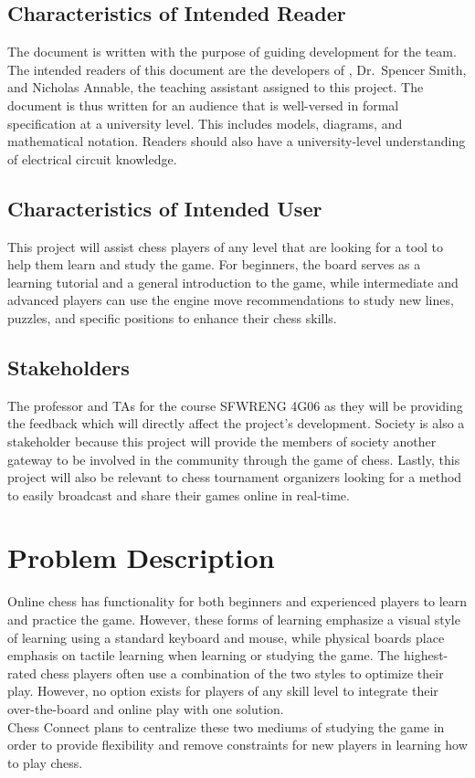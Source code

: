 \documentclass[12pt]{article}
\begin{document}
\subsection{Characteristics of Intended Reader}
{The document is written with the purpose of guiding development for the \progname{} team. The intended readers of this document 
are the developers of \progname{}, Dr.~Spencer Smith, and Nicholas Annable, the teaching assistant assigned to this project. The 
document is thus written for an audience that is well-versed in formal specification at a university level. This includes models, 
diagrams, and mathematical notation. Readers should also have a university-level understanding of electrical circuit knowledge.}

\subsection{Characteristics of Intended User}
{This project will assist chess players of any level that are looking for a tool to help them learn and study the game. For beginners, 
the board serves as a learning tutorial and a general introduction to the game, while intermediate and advanced players can use the 
engine move recommendations to study new lines, puzzles, and specific positions to enhance their chess skills.}

\subsection{Stakeholders}
{The professor and TAs for the course SFWRENG 4G06 as they will be providing the feedback which will directly affect the project’s development. 
Society is also a stakeholder because this project will provide the members of society another gateway to be involved in the community through the game of chess. Lastly, this project will 
also be relevant to chess tournament organizers looking for a method to easily broadcast and share their games online in real-time.}

\section{Problem Description}

{Online chess has functionality for both beginners and experienced players to
learn and practice the game. However, these forms of learning emphasize a
visual style of learning using a standard keyboard and mouse, while physical
boards place emphasis on tactile learning when learning or studying the game.
The highest-rated chess players often use a combination of the two styles to
optimize their play. However, no option exists for players of any skill level to
integrate their over-the-board and online play with one solution.\\
Chess Connect plans to centralize these two mediums of studying the game in
order to provide flexibility and remove constraints for new players in learning
how to play chess.}
\end{document}
